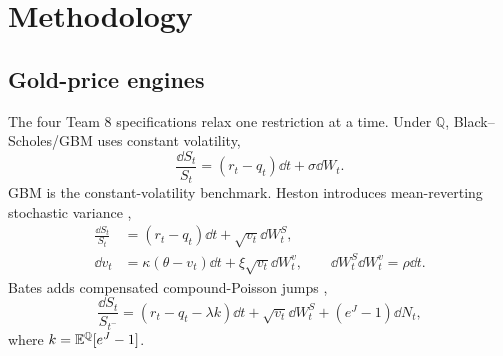 \section{Methodology}

\subsection{Gold-price engines}
The four Team 8 specifications relax one restriction at a time. Under $\mathbb Q$, Black--Scholes/GBM uses constant volatility,
\begin{equation}
\frac{\dd S_t}{S_t}=(r_t-q_t)\dd t+\sigma\dd W_t.
\label{eq:gbm}
\end{equation}
GBM is the constant-volatility benchmark.
Heston introduces mean-reverting stochastic variance \citep{heston1993},
\begin{align}
\frac{\dd S_t}{S_t}&=(r_t-q_t)\dd t+\sqrt{v_t}\dd W_t^{S},\\
\dd v_t&=\kappa(\theta-v_t)\dd t+\xi\sqrt{v_t}\dd W_t^{v},
\qquad \dd W_t^S\dd W_t^v=\rho\dd t.
\label{eq:heston}
\end{align}
Bates adds compensated compound-Poisson jumps \citep{bates1996},
\begin{equation}
\frac{\dd S_t}{S_{t^-}}=(r_t-q_t-\lambda k)\dd t+\sqrt{v_t}\dd W_t^S+(e^J-1)\dd N_t,
\label{eq:bates}
\end{equation}
where $k=\mathbb{E}^{\mathbb Q}[e^J-1]$.

